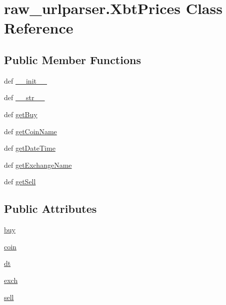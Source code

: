 \hypertarget{classraw__urlparser_1_1_xbt_prices}{\section{raw\-\_\-urlparser.\-Xbt\-Prices Class Reference}
\label{classraw__urlparser_1_1_xbt_prices}
}
\subsection*{Public Member Functions}
\begin{DoxyCompactItemize}
\item 
def \hyperlink{classraw__urlparser_1_1_xbt_prices_aea4d8c7d904f5aeaf71d4e60191aff23}{\-\_\-\-\_\-init\-\_\-\-\_\-}
\item 
def \hyperlink{classraw__urlparser_1_1_xbt_prices_a271c6108e7daef6fa321171e294df088}{\-\_\-\-\_\-str\-\_\-\-\_\-}
\item 
def \hyperlink{classraw__urlparser_1_1_xbt_prices_a50f893a39919d2d0e00e53c6288b68a3}{get\-Buy}
\item 
def \hyperlink{classraw__urlparser_1_1_xbt_prices_a0790deb0fc5582520e2a3249c14a496a}{get\-Coin\-Name}
\item 
def \hyperlink{classraw__urlparser_1_1_xbt_prices_a83c01863eb94413a16ea00cb679245bc}{get\-Date\-Time}
\item 
def \hyperlink{classraw__urlparser_1_1_xbt_prices_a3a8466753538f1491b67174540c32758}{get\-Exchange\-Name}
\item 
def \hyperlink{classraw__urlparser_1_1_xbt_prices_a141a6794eea34f738070970fefc0f854}{get\-Sell}
\end{DoxyCompactItemize}
\subsection*{Public Attributes}
\begin{DoxyCompactItemize}
\item 
\hyperlink{classraw__urlparser_1_1_xbt_prices_a87eba659d6598ffd66c694535e1b7a7a}{buy}
\item 
\hyperlink{classraw__urlparser_1_1_xbt_prices_a8d253ccd987bce28e3aaba7a9c486e5f}{coin}
\item 
\hyperlink{classraw__urlparser_1_1_xbt_prices_ae094aa3e73d21d0be219a085f09bcf13}{dt}
\item 
\hyperlink{classraw__urlparser_1_1_xbt_prices_a016bbd95465aaa14b5c434047df7b7fb}{exch}
\item 
\hyperlink{classraw__urlparser_1_1_xbt_prices_a22b483cac27a5b17f9e7b265c219bb99}{sell}
\end{DoxyCompactItemize}


